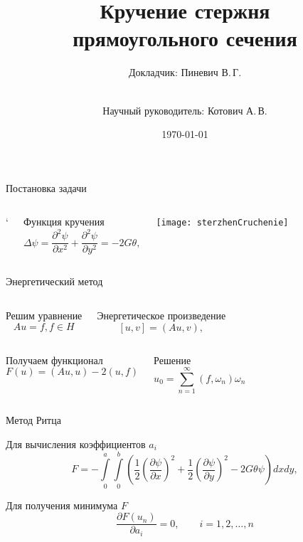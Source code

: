 \documentclass[ignoreonframetext,unicode]{beamer}
\title[Кручение стержня]{Кручение стержня\\ прямоугольного сечения}
\author[Пиневич В.\,Г.]{Докладчик: Пиневич В.\,Г.\and\\[0.5mm] Научный руководитель: Котович А.\,В.}
\institute[каф. Прикладная математика ФН-2]{группа ФН2-51Б}
\date{\today}
\begin{document}
	
	\begin{frame}[plain]
		\maketitle
	\end{frame}

	\begin{frame}{Постановка задачи}
		\begin{columns}
			\column{\textwidth}`
			\begin{block}{Функция кручения}
			 \[
	\label{funCruc}
\Delta \psi = \frac{\partial^2 \psi }{\partial x^2} +
\frac{\partial^2 \psi }{\partial y^2} = -2G \theta, 
			 \]
			\end{block}

		\begin{columns}
			\texttt{[image: sterzhenСruchenie]}
		\end{columns}

		\end{columns}
		
	\end{frame}

	\begin{frame}{Энергетический метод}	
		
		\begin{columns}
			\column{0.5\textwidth}
			\begin{block}{Решим уравнение}	
				\[
Au = f, f \in H
				\]
			\end{block}
		\column{0.5\textwidth}
		\begin{block}{Энергетическое произведение}	
\[
[u, v] = (Au, v),
\]
		\end{block}
		\end{columns}
				
	\begin{columns}
		\column{0.5\textwidth}
		\begin{block}{Получаем функционал}	
	\[
	F(u) = (Au, u) - 2(u, f)
	\]
\end{block}
			\column{0.5\textwidth}
	\begin{block}{Решение}
		\[
		u_0 = \sum\limits_{n = 1}^{\infty} (f, \omega_n)\omega_n
		\]
	\end{block}
	\end{columns}
	
	\end{frame}

\begin{frame}{Метод Ритца}

		
	\begin{block}{Для вычисления коэффициентов $a_i$}	
		\[
		F = - \int\limits_0^a \int\limits_0^b \left(
		\frac{1}{2}
		\left(\frac{\partial\psi}{\partial x}\right)^2 + 
		\frac{1}{2}
		\left(\frac{\partial\psi}{\partial y}\right)^2
		-2G\theta\psi
		\right) dx dy,
		\]
	\end{block}

\begin{block}{Для получения минимума $F$}
	\[
		\frac{\partial F(u_n)}{\partial a_i} = 0, \qquad i = 1, 2, \ldots, n
	\]
\end{block}
	
\end{frame}	
\end{document}
